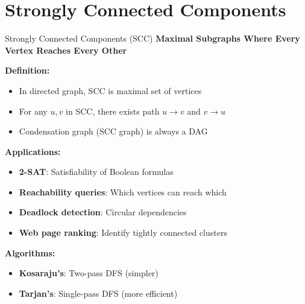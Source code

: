 \documentclass[aspectratio=169]{beamer}
\begin{document}
\section{Strongly Connected Components}

\begin{frame}{Strongly Connected Components (SCC)}
  \textbf{Maximal Subgraphs Where Every Vertex Reaches Every Other}

  \vspace{0.3cm}
  \textbf{Definition:}
  \begin{itemize}
    \item In directed graph, SCC is maximal set of vertices
    \item For any $u, v$ in SCC, there exists path $u \rightarrow v$ and $v \rightarrow u$
    \item Condensation graph (SCC graph) is always a DAG
  \end{itemize}

  \vspace{0.3cm}
  \textbf{Applications:}
  \begin{itemize}
    \item \textbf{2-SAT}: Satisfiability of Boolean formulas
    \item \textbf{Reachability queries}: Which vertices can reach which
    \item \textbf{Deadlock detection}: Circular dependencies
    \item \textbf{Web page ranking}: Identify tightly connected clusters
  \end{itemize}

  \vspace{0.3cm}
  \textbf{Algorithms:}
  \begin{itemize}
    \item \textbf{Kosaraju's}: Two-pass DFS (simpler)
    \item \textbf{Tarjan's}: Single-pass DFS (more efficient)
  \end{itemize}
\end{frame}
\end{document}

